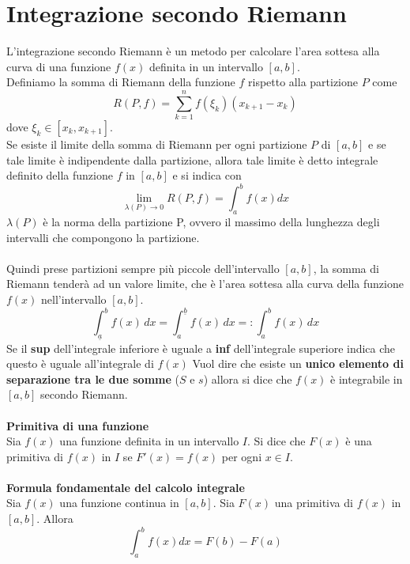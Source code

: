 \documentclass{article}
\begin{document}
\section*{Integrazione secondo Riemann}
L'integrazione secondo Riemann è un metodo per calcolare l'area sottesa alla curva di una funzione $f(x)$ definita in un intervallo $[a,b]$.\\
Definiamo la somma di Riemann della funzione $f$ rispetto alla partizione $P$ come
\begin{equation*}
    R(P,f) = \sum_{k=1}^n f(\xi_k)(x_{k+1}-x_k)
\end{equation*}
dove $\xi_k \in [x_k,x_{k+1}]$.\\
Se esiste il limite della somma di Riemann per ogni partizione $P$ di $[a,b]$ e se tale limite è indipendente dalla partizione, allora tale limite è detto integrale definito della funzione $f$ in $[a,b]$ e si indica con
\begin{equation*}
    \lim_{\lambda(P) \to 0} R(P,f) = \int_a^b f(x)dx
\end{equation*}
$\lambda(P)$ è la norma della partizione P, ovvero il massimo della lunghezza degli intervalli che compongono la partizione.\\\\
Quindi prese partizioni sempre più piccole dell'intervallo $[a,b]$, la somma di Riemann tenderà ad un valore limite, che è l'area sottesa alla curva della funzione $f(x)$ nell'intervallo $[a,b]$.\\

$$
\int_{\underline{a}}^b f(x)\, dx = \int_{a}^{\underline{b}} f(x) \, dx =: \int_{a}^{b} f(x)  \, dx   
$$
Se il \textbf{sup} dell'integrale inferiore è uguale a \textbf{inf} dell'integrale superiore indica che questo è uguale all'integrale di $f(x)$
Vuol dire che esiste un \textbf{unico elemento di separazione tra le due somme} ($S$ e $s$) allora si dice che $f(x)$ è integrabile in $[a,b]$ secondo Riemann.\\\\
\textbf{Primitiva di una funzione}\\
Sia $f(x)$ una funzione definita in un intervallo $I$. Si dice che $F(x)$ è una primitiva di $f(x)$ in $I$ se $F'(x)=f(x)$ per ogni $x \in I$.\\\\
\textbf{Formula fondamentale del calcolo integrale}\\
Sia $f(x)$ una funzione continua in $[a,b]$. Sia $F(x)$ una primitiva di $f(x)$ in $[a,b]$. Allora
\begin{equation*}
    \int_a^b f(x)dx = F(b)-F(a)
\end{equation*}
\end{document}
